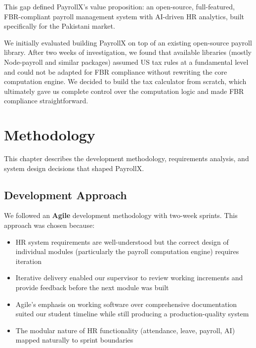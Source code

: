 \documentclass[12pt,a4paper]{report}
\begin{document}
This gap defined PayrollX's value proposition: an open-source, full-featured, FBR-compliant payroll management system with AI-driven HR analytics, built specifically for the Pakistani market.

\begin{failbox}
We initially evaluated building PayrollX on top of an existing open-source payroll library. After two weeks of investigation, we found that available libraries (mostly Node-payroll and similar packages) assumed US tax rules at a fundamental level and could not be adapted for FBR compliance without rewriting the core computation engine. We decided to build the tax calculator from scratch, which ultimately gave us complete control over the computation logic and made FBR compliance straightforward.
\end{failbox}

\chapter{Methodology}
\label{chap:methodology}

This chapter describes the development methodology, requirements analysis, and system design decisions that shaped PayrollX.

\section{Development Approach}

We followed an \textbf{Agile} development methodology with two-week sprints. This approach was chosen because:

\begin{itemize}
    \item HR system requirements are well-understood but the correct design of individual modules (particularly the payroll computation engine) requires iteration
    \item Iterative delivery enabled our supervisor to review working increments and provide feedback before the next module was built
    \item Agile's emphasis on working software over comprehensive documentation suited our student timeline while still producing a production-quality system
    \item The modular nature of HR functionality (attendance, leave, payroll, AI) mapped naturally to sprint boundaries
\end{itemize}
\end{document}
